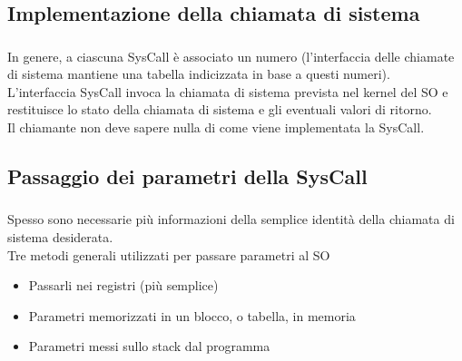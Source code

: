 \documentclass{beamer}
\newenvironment{mainframe}{
	\begin{frame}
		\frametitle{\insertsubsection}
		\framesubtitle{\insertsection}
	}{
	\end{frame}
}
\begin{document}
\subsection{Implementazione della chiamata di sistema}
\begin{mainframe}
	In genere, a ciascuna SysCall è associato un numero (l'interfaccia delle chiamate di sistema mantiene una tabella indicizzata in base a questi numeri).\\
	L'interfaccia SysCall invoca la chiamata di sistema prevista nel kernel del SO e restituisce lo stato della chiamata di sistema e gli eventuali valori di ritorno.\\
	Il chiamante non deve sapere nulla di come viene implementata la SysCall.
\end{mainframe}
\subsection{Passaggio dei parametri della SysCall}
\begin{mainframe}
	Spesso sono necessarie più informazioni della semplice identità della chiamata di sistema desiderata.\\
	Tre metodi generali utilizzati per passare parametri al SO
	\begin{itemize}
		\item Passarli nei registri (più semplice)
		\item Parametri memorizzati in un blocco, o tabella, in memoria
		\item Parametri messi sullo stack dal programma
	\end{itemize}
\end{mainframe}
\end{document}
